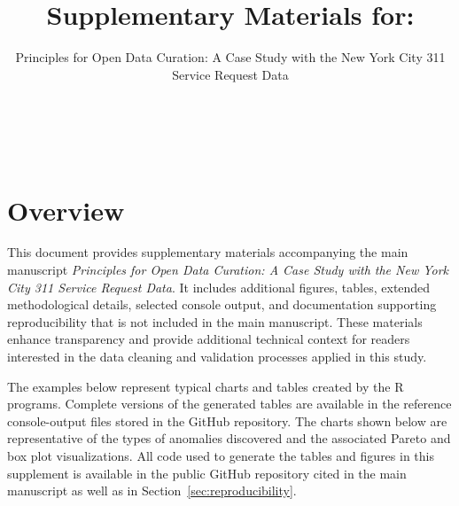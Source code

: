 \documentclass[linenumber]{jdsart}
\begin{document}
\begin{frontmatter}

\title{\Large Supplementary Materials for:}
\subtitle{\large Principles for Open Data Curation: A Case Study with the New York City 311 Service Request Data\\[2ex]}

\author[1]{~}
\author[2]{~}


\address[1]{, }
\address[2]{Department of Statistics, , }

\begin{keyword}
\end{keyword}

\end{frontmatter}



\section{Overview}


This document provides supplementary materials accompanying the main manuscript
\emph{Principles for Open Data Curation: A Case Study with the New York City 
311 Service Request Data}. It includes additional figures, tables, extended 
methodological details, selected console output, and documentation 
supporting reproducibility that is not included in the main manuscript. These 
materials enhance transparency and provide additional technical 
context for readers interested in the data cleaning and validation 
processes applied in this study.


The examples below represent typical charts and tables created by the 
R programs. Complete versions of the generated tables are available in the
reference console-output files stored in the GitHub repository. The charts shown below are
representative of the types of anomalies discovered and the associated
Pareto and box plot visualizations. All code used to generate the tables 
and figures in this supplement is available in the public GitHub repository 
cited in the main manuscript as well as in Section~\ref{sec:reproducibility}.
\end{document}
